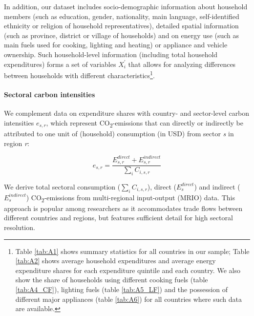 \documentclass[12pt, a4paper]{article}
\begin{document}
In addition, our dataset includes socio-demographic information about household members (such as education, gender, nationality, main language, self-identified ethnicity or religion of household representatives), detailed spatial information (such as province, district or village of households) and on energy use (such as main fuels used for cooking, lighting and heating) or appliance and vehicle ownership. Such household-level information (including total household expenditures) forms a set of variables $X_{i}^{'}$ that allows for analyzing differences between households with different characteristics\footnote{Table \ref{tab:A1} shows summary statistics for all countries in our sample; Table \ref{tab:A2} shows average household expenditures and average energy expenditure shares for each expenditure quintile and each country. We also show the share of households using different cooking fuels (table \ref{tab:A4_CF}), lighting fuels (table \ref{tab:A5_LF}) and the possession of different major appliances (table \ref{tab:A6}) for all countries where such data are available.}.

\paragraph{Sectoral carbon intensities} We complement data on expenditure shares with country- and sector-level carbon intensities $e_{s,r}$, which represent CO\textsubscript{2}-emissions that can directly or indirectly be attributed to one unit of (household) consumption (in USD) from sector \textit{s} in region \textit{r}:

\begin{equation}
    e_{s,r} = \frac{E_{s,r}^{direct}+E_{s,r}^{indirect}}{\sum_{i} C_{i,s,r}}
\end{equation}

We derive total sectoral consumption ($\sum_{i} C_{i,s,r}$), direct ($E_{s}^{direct}$) and indirect ($E_{s}^{indirect}$) CO\textsubscript{2}-emissions from  multi-regional input-output (MRIO) data. This approach is popular among researchers as it accommodates trade flows between different countries and regions, but features sufficient detail for high sectoral resolution. 
\end{document}
